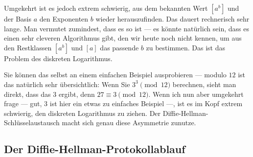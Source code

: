 \begin{spoken-clean}[00:18:21 - 00:20:33]
Umgekehrt ist es jedoch extrem schwierig, aus dem bekannten Wert $[a^b]$ und der Basis $a$ den Exponenten $b$ wieder herauszufinden. Das dauert rechnerisch sehr lange. Man vermutet zumindest, dass es so ist --- es könnte natürlich sein, dass es einen sehr cleveren Algorithmus gibt, den wir heute noch nicht kennen, um aus den Restklassen $[a^b]$ und $[a]$ das passende $b$ zu bestimmen. Das ist das Problem des diskreten Logarithmus.

Sie können das selbst an einem einfachen Beispiel ausprobieren --- modulo $12$ ist das natürlich sehr übersichtlich: Wenn Sie $3^3 \pmod{12}$ berechnen, sieht man direkt, dass das $3$ ergibt, denn $27 \equiv 3 \pmod{12}$. Wenn ich nun aber umgekehrt frage --- gut, $3$ ist hier ein etwas zu einfaches Beispiel ---, ist es im Kopf extrem schwierig, den diskreten Logarithmus zu ziehen. Der Diffie-Hellman-Schlüsselaustausch macht sich genau diese Asymmetrie zunutze.
\end{spoken-clean}

\begin{math-stroke}
\end{math-stroke}

\subsection{Der Diffie-Hellman-Protokollablauf}

